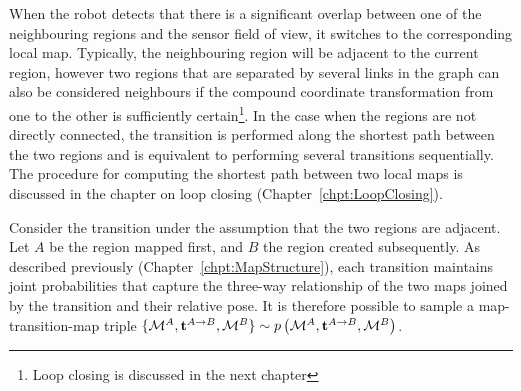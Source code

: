 When the robot detects that there is a significant overlap between one
of the neighbouring regions and the sensor field of view, it switches
to the corresponding local map. Typically, the neighbouring region
will be adjacent to the current region, however two regions that are
separated by several links in the graph can also be considered
neighbours if the compound coordinate transformation from one to the
other is sufficiently certain\footnote{Loop closing is discussed in
  the next chapter}. In the case when the regions are not
directly connected, the transition is performed along the shortest
path between the two regions and is equivalent to performing several
transitions sequentially. The procedure for computing the shortest
path between two local maps is discussed in the chapter on loop
closing (Chapter~\ref{chpt:LoopClosing}).

Consider the transition under the assumption that the two regions are
adjacent. Let $A$ be the region mapped first, and $B$ the region
created subsequently. As described previously
(Chapter~\ref{chpt:MapStructure}), each transition maintains joint
probabilities that capture the three-way relationship of the two maps
joined by the transition and their relative pose. It is therefore
possible to sample a map-transition-map triple $\{
{\mapA,\tr{}{A}{B},\mapB} \} \sim \prob{\mapA,\tr{}{A}{B},\mapB} $.
 

